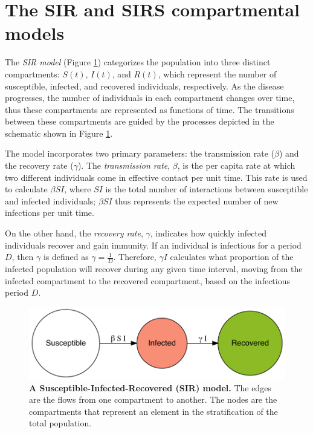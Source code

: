\documentclass[
11pt, %
oneside, %
english, %
singlespacing, %
]{macthesis} %
\begin{document}
\section{The SIR and SIRS compartmental models}\label{the-sir-and-sirs-compartmental-models}

The \emph{SIR model} (Figure \ref{fig:sir-model}) categorizes the population into three distinct compartments: \(S(t)\), \(I(t)\), and \(R(t)\), which represent the number of susceptible, infected, and recovered individuals, respectively. As the disease progresses, the number of individuals in each compartment changes over time, thus these compartments are represented as functions of time. The transitions between these compartments are guided by the processes depicted in the schematic shown in Figure \ref{fig:sir-model}.

The model incorporates two primary parameters: the transmission rate (\(\beta\)) and the recovery rate (\(\gamma\)). The \emph{transmission rate}, \(\beta\), is the per capita rate at which two different individuals come in effective contact per unit time. This rate is used to calculate \(\beta SI\), where \(SI\) is the total number of interactions between susceptible and infected individuals; \(\beta SI\) thus represents the expected number of new infections per unit time.

On the other hand, the \emph{recovery rate}, \(\gamma\), indicates how quickly infected individuals recover and gain immunity. If an individual is infectious for a period \(D\), then \(\gamma\) is defined as \(\gamma = \frac{1}{D}\). Therefore, \(\gamma I\) calculates what proportion of the infected population will recover during any given time interval, moving from the infected compartment to the recovered compartment, based on the infectious period \(D\).

\begin{figure}[H]
\centering
\includegraphics[width=\textwidth]{figure/sir_model.png}
\caption[Susceptible-Infected-Recovered (SIR) model]{\textbf{A Susceptible-Infected-Recovered (SIR) model.} The edges are the flows from one compartment to another. The nodes are the compartments that represent an element in the stratification of the total population.}
\label{fig:sir-model}
\end{figure}
\end{document}
